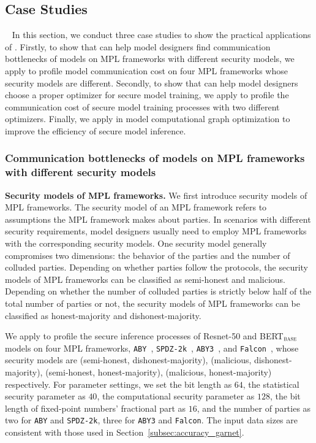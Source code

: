 \subsection{Case Studies}~\label{subsec:case_studies}
In this section, we conduct three case studies to show the practical applications of \hawkeye. Firstly, to show that \hawkeye can help model designers find communication bottlenecks of models on MPL frameworks with different security models, we apply \hawkeye to profile model communication cost on four MPL frameworks whose security models are different. Secondly, to show that \hawkeye can help model designers choose a proper optimizer for secure model training, we apply \hawkeye to profile the communication cost of secure model training processes with two different optimizers. Finally, we apply \hawkeye in model computational graph optimization to improve the efficiency of secure model inference.

\subsubsection{Communication bottlenecks of models on MPL frameworks with different security models}
\noindent\textbf{Security models of MPL frameworks.} We first introduce security models of MPL frameworks. The security model of an MPL framework refers to assumptions the MPL framework makes about parties. In scenarios with different security requirements, model designers usually need to employ MPL frameworks with the corresponding security models. One security model generally compromises two dimensions: the behavior of the parties and the number of colluded parties. Depending on whether parties follow the protocols, the security models of MPL frameworks can be classified as semi-honest and malicious. Depending on whether the number of colluded parties is strictly below half of the total number of parties or not, the security models of MPL frameworks can be classified as honest-majority and dishonest-majority.

We apply \hawkeye to profile the secure inference processes of Resnet-50 and BERT$_{\textsc{base}}$ models on four MPL frameworks,   \texttt{ABY}~\cite{aby}, \texttt{SPDZ-2k}~\cite{spdz2k}, \texttt{ABY3}~\cite{mohassel2018aby3}, and \texttt{Falcon}~\cite{wagh2020falcon}, whose security models are (semi-honest, dishonest-majority), (malicious, dishonest-majority), (semi-honest, honest-majority),  (malicious, honest-majority) respectively.
For parameter settings, we set the bit length as $64$, the statistical security parameter as $40$, the computational security parameter as $128$, the bit length of fixed-point numbers' fractional part as $16$, and the number of parties as two for \texttt{ABY} and \texttt{SPDZ-2k}, three for \texttt{ABY3} and \texttt{Falcon}. The input data sizes are consistent with those used in Section~\ref{subsec:accuracy_garnet}.

